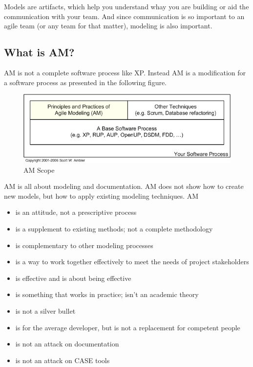 Models are artifacts, which help you understand whay you are building or aid the
communication with your team. And since communication is so important to an
agile team (or any team for that matter), modeling is also important.

\subsection{What is AM?}
AM is not a complete software process like XP. Instead AM is a modification for
a software process as presented in the following figure.
 \begin{figure}[h]
  \caption[AM Scope]{AM Scope\cite{AM}}
  \label{jee}
  \center
  	\includegraphics[scale=0.5]{../resources/amScope.jpg}
\end{figure}
AM is all about modeling and documentation. AM does not show how to create new
models, but how to apply existing modeling techniques. AM
\begin{itemize}
\item is an attitude, not a prescriptive process
\item is a supplement to existing methods; not a complete methodology
\item is complementary to other modeling processes
\item is a way to work together effectively to meet the needs of project
stakeholders
\item is effective and is about being effective
\item is something that works in practice; isn't an academic theory
\item is not a silver bullet
\item is for the average developer, but is not a replacement for competent
people
\item is not an attack on documentation
\item is not an attack on CASE tools\cite{Ambler200204}
\end{itemize}

